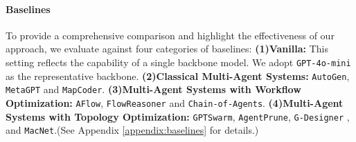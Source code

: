 \documentclass{article}
\theoremstyle{definition}
\begin{document}
\paragraph{Baselines}
To provide a comprehensive comparison and highlight the effectiveness of our approach, we evaluate against four categories of baselines:  
\textbf{(1)Vanilla: } This setting reflects the capability of a single backbone model. We adopt \texttt{GPT-4o-mini} as the representative backbone.  \textbf{(2)Classical Multi-Agent Systems: } \texttt{AutoGen}\citep{wu2024autogen}, \texttt{MetaGPT}\citep{hong2024metagpt} and \texttt{MapCoder}\citep{islam2024mapcoder}.  \textbf{(3)Multi-Agent Systems with Workflow Optimization: } \texttt{AFlow}\citep{zhang2024aflow}, \texttt{FlowReasoner}\citep{gao2025flowreasoner} and \texttt{Chain-of-Agents}. \textbf{(4)Multi-Agent Systems with Topology Optimization: }\texttt{GPTSwarm}\citep{zhuge2024gptswarm}, \texttt{AgentPrune}\citep{zhang2024cut}, \texttt{G-Designer} \citep{zhang2024g}, and \texttt{MacNet}\citep{qian2024scaling}.(See Appendix \ref{appendix:baselines} for details.) 
\end{document}
